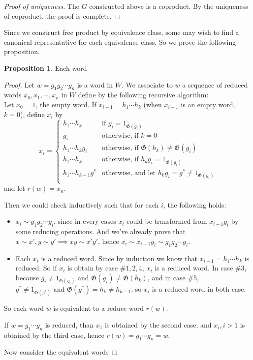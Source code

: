 \documentclass[a4paper,titlepage]{article}
\theoremstyle{remark}
\theoremstyle{definition}
\theoremstyle{theorem}
\newtheorem{proposition}{Proposition}
\newcommand{\gid}{\mathfrak{G}}
\begin{document}
  \begin{proof}[Proof of uniqueness]
    The $G$ constructed above is a coproduct. By the uniqueness of coproduct, the proof is complete.
  \end{proof}

  Since we construct free product by equivalence class, some may wish to find a canonical
  representative for each equivalence class. So we prove the following proposition.

  \begin{proposition}
    Each word
  \end{proposition}

  \begin{proof}
    Let $w = g_1 g_2 \cdots g_n$ is a word in $W$. We associate to $w$ a sequence of reduced words
    $x_0, x_1, \cdots, x_n$ in $W$ define by the following recursive algorithm: \\
    Let $x_0 = 1$, the empty word. If $x_{i-1} = h_1 \cdots h_k$ (when $x_{i-1}$ is an empty word, $k = 0$),
    define $x_i$ by
    \[
      x_i = \begin{cases}
        h_1 \cdots h_k & \text{if } g_i = 1_{\gid(g_i)} \\
        g_i & \text{otherwise, if } k = 0 \\
        h_1 \cdots h_k g_i & \text{otherwise, if } \gid(h_k) \neq \gid(g_i) \\
        h_1 \cdots h_k & \text{otherwise, if } h_k g_i = 1_{\gid(g_i)} \\
        h_1 \cdots h_{k-1} g^* & \text{otherwise, and let } h_k g_i = g^* \neq 1_{\gid(g_i)} \\
      \end{cases}
    \]
    and let $r(w) = x_n$.

    Then we could check inductively such that for each $i$, the following holds:
    \begin{itemize}
      \item $x_i \sim g_1 g_2 \cdots g_i$, since in every cases $x_i$ could be transformed from $x_{i-1} g_i$
        by some reducing operations. And we've already prove that $x \sim x', y \sim y' \implies xy \sim x'y'$,
        hence $x_i \sim x_{i-1} g_i \sim g_1 g_2 \cdots g_i$.
      \item Each $x_i$ is a reduced word. Since by induction we know that $x_{i-1} = h_1 \cdots h_k$ is reduced. 
        So if $x_i$ is obtain by case \#$1, 2, 4$, $x_i$ is a reduced word. In case \#3, because $g_i \neq 1_{\gid(g_i)}$
        and $\gid(g_i) \neq \gid(h_k)$, and in case \#5, $g^* \neq 1_{\gid(g^*)} \text{ and } \gid(g^*) = h_k \neq h_{k-1}$,
        so $x_i$ is a reduced word in both case.
    \end{itemize}
    So each word $w$ is equivalent to a reduce word $r(w)$.

    If $w = g_1 \cdots g_n$ is reduced, than $x_1$ is obtained by the second case, and $x_i, i > 1$ is
    obtained by the third case, hence $r(w) = g_1 \cdots g_n = w$.

    Now consider the equivalent words

  \end{proof}
\end{document}

